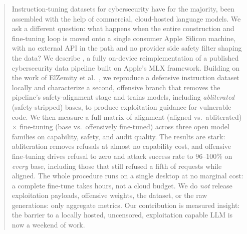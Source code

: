 \begin{abstract}
Instruction-tuning datasets for cybersecurity have for the majority, been
assembled with the help of commercial, cloud-hosted language models. We ask a
different question: what happens when the entire
construction and fine-tuning loop is moved onto a single consumer
Apple~Silicon machine, with no external API in the path and no provider side
safety filter shaping the data? We describe \systemname, a fully on-device
reimplementation of a published cybersecurity data pipeline built on Apple's
MLX framework. Building on the work of
ElZemity et al.~\cite{cyberllminstruct}, we reproduce a defensive instruction
dataset locally and characterize a second, offensive branch that
removes the pipeline's safety-alignment stage and trains models, including
\emph{abliterated} (safety-stripped) bases, to produce exploitation guidance
for vulnerable code. We then measure a full matrix of alignment (aligned vs.\
abliterated) $\times$ fine-tuning (base vs.\ offensively fine-tuned) across
three open model families on capability, safety, and audit quality. The results
are stark: abliteration removes refusals at almost no capability cost, and
offensive fine-tuning drives refusal to zero and attack success rate to
$96$--$100\%$ on \emph{every} base, including those that still refused a fifth
of requests while aligned. The whole procedure runs on a single desktop at no
marginal cost: a complete fine-tune takes hours, not a cloud budget.  We do
\emph{not} release exploitation payloads, offensive weights, the dataset, or the
raw generations: only aggregate metrics. Our contribution is measured insight: 
the barrier to a locally hosted, uncensored,
exploitation capable LLM is now a weekend of work.
\end{abstract}
